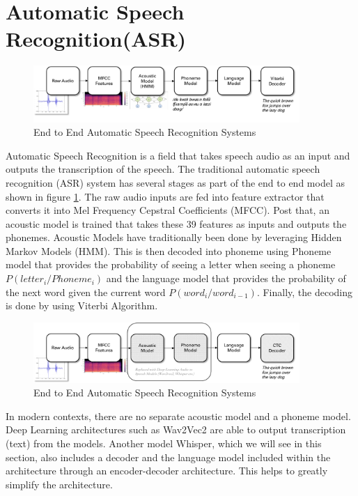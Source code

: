 \section{Automatic Speech Recognition(ASR)}%
\label{sec:e2easrsystems}

\begin{figure} [H]
    \centering
    \includegraphics[width=0.9\textwidth]{03-Theoretical Foundations/figures/e2e_asr.pdf}
    \caption{End to End Automatic Speech Recognition Systems}
    \label{fig:e2easr}
\end{figure}

Automatic Speech Recognition is a field that takes speech audio as an input and outputs the transcription of the speech. The traditional automatic speech recognition (ASR) system has several stages as part of the end to end model as shown in figure \ref{fig:e2easr}. The raw audio inputs are fed into feature extractor that converts it into Mel Frequency Cepstral Coefficients (MFCC). Post that, an acoustic model is trained that takes these 39 features as inputs and outputs the phonemes. Acoustic Models have traditionally been done by leveraging Hidden Markov Models (HMM). This is then decoded into phoneme using Phoneme model that provides the probability of seeing a letter when seeing a phoneme $P(letter_i/Phoneme_i)$ and the language model that provides the probability of the next word given the current word $P(word_i/word_{i-1})$. Finally, the decoding is done by using Viterbi Algorithm. 

\begin{figure} [H]
    \centering
    \includegraphics[width=0.9\textwidth]{03-Theoretical Foundations/figures/deeplearning_asr_systems.pdf}
    \caption{End to End Automatic Speech Recognition Systems}
    \label{fig:deepasr}
\end{figure}


In modern contexts, there are no separate acoustic model and a phoneme model. Deep Learning architectures such as Wav2Vec2 are able to output transcription (text) from the models. Another model Whisper, which we will see in this section, also includes a decoder and the language model included within the architecture through an encoder-decoder architecture. This helps to greatly simplify the architecture.


